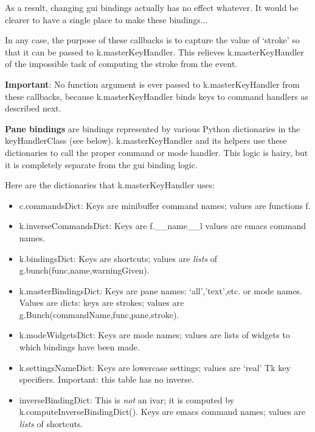 \documentclass[a4paper,10pt,english]{sphinxmanual}
\begin{document}
As a result, changing gui bindings actually has no effect whatever.
It would be clearer to have a single place to make these bindings...

In any case, the purpose of these callbacks is to capture the value of `stroke' so
that it can be passed to k.masterKeyHandler.
This relieves k.masterKeyHandler of the impossible task of computing the stroke from the event.

\textbf{Important}:  No function argument is ever passed to k.masterKeyHandler from these callbacks,
because k.masterKeyHandler binds keys to command handlers as described next.

\textbf{Pane bindings} are bindings represented by various Python dictionaries in the
keyHandlerClass (see below). k.masterKeyHandler and its helpers use these
dictionaries to call the proper command or mode handler. This logic is hairy,
but it is completely separate from the gui binding logic.

Here are the dictionaries that k.masterKeyHandler uses:
\begin{itemize}
\item {} 
c.commandsDict:
Keys are minibuffer command names; values are functions f.

\item {} 
k.inverseCommandsDict:
Keys are f.\_\_name\_\_l values are emacs command names.

\item {} 
k.bindingsDict:
Keys are shortcuts; values are \emph{lists} of g.bunch(func,name,warningGiven).

\item {} 
k.masterBindingsDict:
Keys are pane names: `all','text',etc. or mode names.
Values are dicts:  keys are strokes; values are g.Bunch(commandName,func,pane,stroke).

\item {} 
k.modeWidgetsDict:
Keys are mode names; values are lists of widgets to which bindings have been made.

\item {} 
k.settingsNameDict:
Keys are lowercase settings; values are `real' Tk key specifiers.
Important: this table has no inverse.

\item {} 
inverseBindingDict:
This is \emph{not} an ivar; it is computed by k.computeInverseBindingDict().
Keys are emacs command names; values are \emph{lists} of shortcuts.

\end{itemize}
\end{document}
